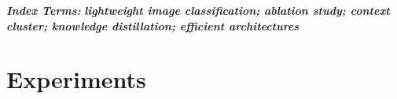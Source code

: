 \documentclass[9pt, conference, a4paper, compsocconf]{IEEEtran}
\makeatletter
\renewenvironment{IEEEkeywords}
  {\normalfont
   \@IEEEabskeysecsize
   \vspace{0.3em}
   \setlength{\parindent}{0pt}
   \noindent
   {\bfseries\itshape \IEEEkeywordsname: }\ignorespaces}
  {\par}
\renewcommand{\IEEEkeywordsname}{Index Terms}
\makeatother
\begin{document}
\begin{IEEEkeywords}
\textbf{\textit{lightweight image classification; ablation study; context cluster; knowledge distillation; efficient architectures}}
\end{IEEEkeywords}

\IEEEpeerreviewmaketitle



\section{Experiments}
\label{sec:exp}



\end{document}
